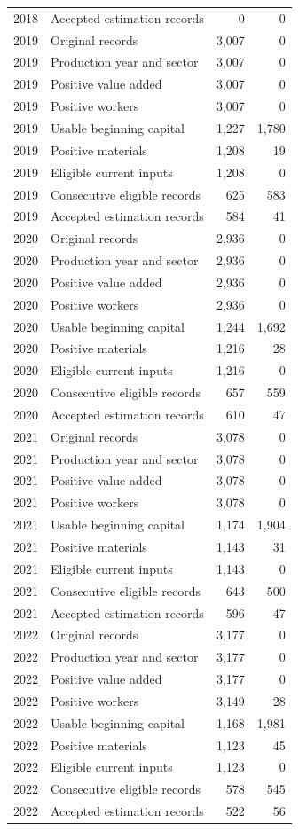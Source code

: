 \begin{longtable}{llrr}
2018 & Accepted estimation records & 0 & 0 \\
2019 & Original records & 3,007 & 0 \\
2019 & Production year and sector & 3,007 & 0 \\
2019 & Positive value added & 3,007 & 0 \\
2019 & Positive workers & 3,007 & 0 \\
2019 & Usable beginning capital & 1,227 & 1,780 \\
2019 & Positive materials & 1,208 & 19 \\
2019 & Eligible current inputs & 1,208 & 0 \\
2019 & Consecutive eligible records & 625 & 583 \\
2019 & Accepted estimation records & 584 & 41 \\
2020 & Original records & 2,936 & 0 \\
2020 & Production year and sector & 2,936 & 0 \\
2020 & Positive value added & 2,936 & 0 \\
2020 & Positive workers & 2,936 & 0 \\
2020 & Usable beginning capital & 1,244 & 1,692 \\
2020 & Positive materials & 1,216 & 28 \\
2020 & Eligible current inputs & 1,216 & 0 \\
2020 & Consecutive eligible records & 657 & 559 \\
2020 & Accepted estimation records & 610 & 47 \\
2021 & Original records & 3,078 & 0 \\
2021 & Production year and sector & 3,078 & 0 \\
2021 & Positive value added & 3,078 & 0 \\
2021 & Positive workers & 3,078 & 0 \\
2021 & Usable beginning capital & 1,174 & 1,904 \\
2021 & Positive materials & 1,143 & 31 \\
2021 & Eligible current inputs & 1,143 & 0 \\
2021 & Consecutive eligible records & 643 & 500 \\
2021 & Accepted estimation records & 596 & 47 \\
2022 & Original records & 3,177 & 0 \\
2022 & Production year and sector & 3,177 & 0 \\
2022 & Positive value added & 3,177 & 0 \\
2022 & Positive workers & 3,149 & 28 \\
2022 & Usable beginning capital & 1,168 & 1,981 \\
2022 & Positive materials & 1,123 & 45 \\
2022 & Eligible current inputs & 1,123 & 0 \\
2022 & Consecutive eligible records & 578 & 545 \\
2022 & Accepted estimation records & 522 & 56 \\
\end{longtable}
